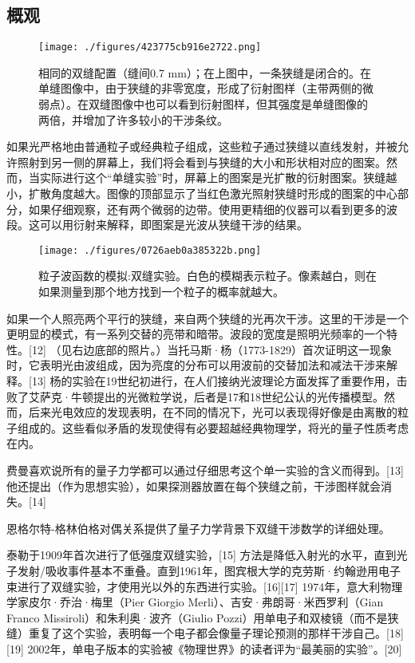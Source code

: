 \subsection{概观}
\begin{figure}[ht]
\centering
\texttt{[image: ./figures/423775cb916e2722.png]}
\caption{相同的双缝配置（缝间0.7 mm）；在上图中，一条狭缝是闭合的。在单缝图像中，由于狭缝的非零宽度，形成了衍射图样（主带两侧的微弱点）。在双缝图像中也可以看到衍射图样，但其强度是单缝图像的两倍，并增加了许多较小的干涉条纹。} \label{fig_SFSY_1}
\end{figure}
如果光严格地由普通粒子或经典粒子组成，这些粒子通过狭缝以直线发射，并被允许照射到另一侧的屏幕上，我们将会看到与狭缝的大小和形状相对应的图案。然而，当实际进行这个“单缝实验”时，屏幕上的图案是光扩散的衍射图案。狭缝越小，扩散角度越大。图像的顶部显示了当红色激光照射狭缝时形成的图案的中心部分，如果仔细观察，还有两个微弱的边带。使用更精细的仪器可以看到更多的波段。这可以用衍射来解释，即图案是光波从狭缝干涉的结果。
\begin{figure}[ht]
\centering
\texttt{[image: ./figures/0726aeb0a385322b.png]}
\caption{粒子波函数的模拟:双缝实验。白色的模糊表示粒子。像素越白，则在如果测量到那个地方找到一个粒子的概率就越大。} \label{fig_SFSY_2}
\end{figure}
如果一个人照亮两个平行的狭缝，来自两个狭缝的光再次干涉。这里的干涉是一个更明显的模式，有一系列交替的亮带和暗带。波段的宽度是照明光频率的一个特性。[12] （见右边底部的照片。）当托马斯·杨（1773-1829）首次证明这一现象时，它表明光由波组成，因为亮度的分布可以用波前的交替加法和减法干涉来解释。[13] 杨的实验在19世纪初进行，在人们接纳光波理论方面发挥了重要作用，击败了艾萨克·牛顿提出的光微粒学说，后者是17和18世纪公认的光传播模型。然而，后来光电效应的发现表明，在不同的情况下，光可以表现得好像是由离散的粒子组成的。这些看似矛盾的发现使得有必要超越经典物理学，将光的量子性质考虑在内。

费曼喜欢说所有的量子力学都可以通过仔细思考这个单一实验的含义而得到。[13] 他还提出（作为思想实验），如果探测器放置在每个狭缝之前，干涉图样就会消失。[14]

恩格尔特-格林伯格对偶关系提供了量子力学背景下双缝干涉数学的详细处理。

泰勒于1909年首次进行了低强度双缝实验，[15] 方法是降低入射光的水平，直到光子发射/吸收事件基本不重叠。直到1961年，图宾根大学的克劳斯·约翰逊用电子束进行了双缝实验，才使用光以外的东西进行实验。[16][17] 1974年，意大利物理学家皮尔·乔治·梅里（Pier Giorgio Merli）、吉安·弗朗哥·米西罗利（Gian Franco Missiroli）和朱利奥·波齐（Giulio Pozzi）用单电子和双棱镜（而不是狭缝）重复了这个实验，表明每一个电子都会像量子理论预测的那样干涉自己。[18][19] 2002年，单电子版本的实验被《物理世界》的读者评为“最美丽的实验”。[20]

